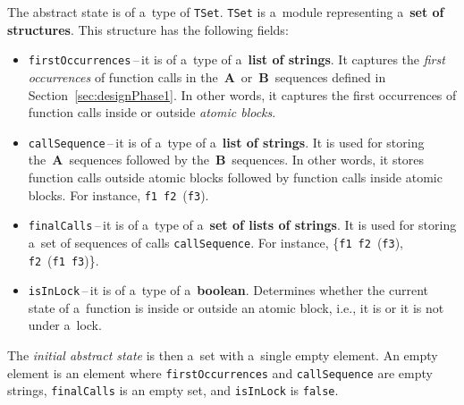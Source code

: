 The abstract state is of a~type of \texttt{TSet}. \texttt{TSet} is a~module
representing a~\textbf{set of structures}. This structure has the following
fields:
\begin{itemize}
    \item
        \texttt{firstOccurrences}\,--\,it is of a~type of a~\textbf{list of
        strings}. It captures the \emph{first occurrences} of function calls
        in the~\textbf{A}~or~\textbf{B}~sequences defined in
        Section~\ref{sec:designPhase1}. In other words, it captures
        the first occurrences of function calls inside or outside
        \emph{atomic blocks}.

    \item
        \texttt{callSequence}\,--\,it is of a~type of a~\textbf{list of
        strings}. It is used for storing the~\textbf{A}~sequences
        followed by the~\textbf{B}~sequences. In other words, it stores
        function calls outside atomic blocks followed by function calls
        inside atomic blocks.
        For instance, \texttt{f1}~\texttt{f2}~(\texttt{f3}).

    \item
        \texttt{finalCalls}\,--\,it is of a~type of a~\textbf{set of lists
        of strings}. It is used for storing a~set of sequences of calls
        \texttt{callSequence}. For instance,
        \{\texttt{f1}~\texttt{f2}~(\texttt{f3}),
        \texttt{f2}~(\texttt{f1}~\texttt{f3})\}.

    \item
        \texttt{isInLock}\,--\,it is of a~type of a~\textbf{boolean}. Determines
        whether the current state of a~function is inside or outside
        an atomic block, i.e., it is or it is not under a~lock.
\end{itemize}
The \emph{initial abstract state} is then a~set with a~single empty element.
An empty element is an element where \texttt{firstOccurrences} and
\texttt{callSequence} are empty strings, \texttt{finalCalls} is an empty set,
and \texttt{isInLock} is \texttt{false}.

